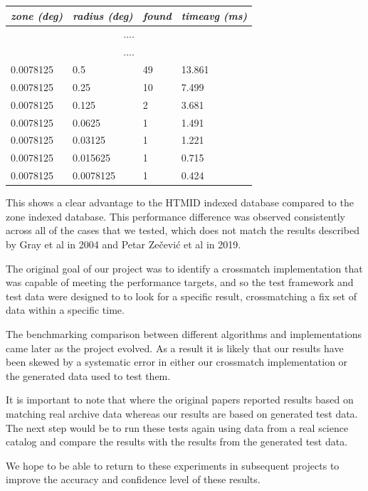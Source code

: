 \documentclass{article}
\newcommand{\htmid} {HTMID\xspace}
\newcommand{\crossmatch} {crossmatch\xspace}
\newcommand{\crossmatching} {crossmatching\xspace}
\newcommand{\benchmarking} {benchmarking\xspace}
\begin{document}
\begin{table}[hbt!]
\centering
\begin{tabular}{|l|l|l|l|}
\hline
\textit{zone (deg)} & \textit{radius (deg)} & \textit{found} & \textit{timeavg (ms)} \\ \hline
\multicolumn{4}{|c|}{....} \\ \hline
\multicolumn{4}{|c|}{....} \\ \hline
0.0078125 & 0.5       & 49 & 13.861 \\ \hline
0.0078125 & 0.25      & 10 &  7.499 \\ \hline
0.0078125 & 0.125     &  2 &  3.681 \\ \hline
0.0078125 & 0.0625    &  1 &  1.491 \\ \hline
0.0078125 & 0.03125   &  1 &  1.221 \\ \hline
0.0078125 & 0.015625  &  1 &  0.715 \\ \hline
0.0078125 & 0.0078125 &  1 &  0.424 \\ \hline
\end{tabular}
\end{table}

This shows a clear advantage to the \htmid indexed database compared to the zone indexed database.
This performance difference was observed consistently across all of the cases that we tested, which does not match the results described by Gray et al in 2004\cite{Gray-2004} and Petar Zečević et al in 2019\cite{Zecevic-2019}.

The original goal of our project was to identify a \crossmatch
implementation that was capable of meeting the performance targets, and so the test framework and test data were designed to to look for a specific result, \crossmatching a fix set of data within a specific time.

The \benchmarking comparison between different algorithms and implementations came later as the project evolved. As a result it is likely that our results have been skewed by a systematic error in either our \crossmatch implementation or the generated data used to test them.

It is important to note that where the original papers reported results based on matching real archive data whereas our results are based on generated test data.
The next step would be to run these tests again using data from a real science catalog and compare the results with the results from the generated test data.

We hope to be able to return to these experiments in subsequent projects to improve the accuracy and confidence level of these results.
\end{document}
